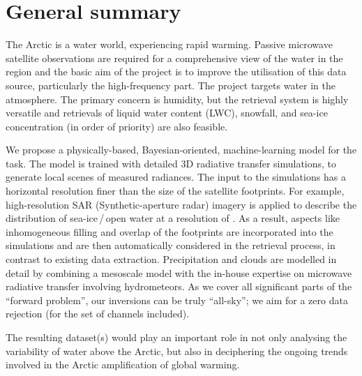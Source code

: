 \documentclass[12pt,oneside,a4paper]{article}
\begin{document}
	
	
	\thispagestyle{empty}
	\vspace*{-10mm}
	\noindent
	\textbf{\Large \LongTitle}




\section{General summary}
%
The Arctic is a water world, experiencing rapid warming. Passive microwave
satellite observations are required for a comprehensive view of the water in the region and the basic aim of the project is to improve the utilisation of this data source, particularly the high-frequency part. The project targets water in the atmosphere. The primary concern is humidity, but
the retrieval system is highly versatile and retrievals of liquid water  content (LWC), snowfall, and sea-ice concentration (in order of priority) are also
feasible.

We propose a physically-based, Bayesian-oriented, machine-learning model for
the task. The model is trained with detailed 3D radiative transfer simulations,
to generate local scenes of measured radiances. The input to the simulations
has a horizontal resolution finer than the size of the satellite footprints.
For example, high-resolution SAR (Synthetic-aperture radar) imagery is applied to describe the
distribution of sea-ice\,/\,open water at a resolution of . As a result,
aspects like inhomogeneous filling and overlap of the footprints are
incorporated into the simulations and are then automatically considered in the
retrieval process, in contrast to existing data extraction. Precipitation and
clouds are modelled in detail by combining a mesoscale model with the in-house
expertise on microwave radiative transfer involving hydrometeors. As we cover
all significant parts of the ``forward problem'', our inversions can be truly
``all-sky''; we aim for a zero data rejection (for the set of channels
included).

The resulting dataset(s) would play an important role in not only analysing the
variability of water above the Arctic, but also in deciphering the
ongoing trends involved in the Arctic amplification of global warming.
\end{document}
